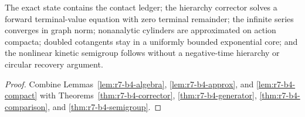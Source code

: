 \begin{theorem}
\label{thm:r7-b4-main}
The exact state contains the contact ledger; the hierarchy corrector solves a
forward terminal-value equation with zero terminal remainder; the infinite
series converges in graph norm; nonanalytic cylinders are approximated on
action compacta; doubled cotangents stay in a uniformly bounded exponential
core; and the nonlinear kinetic semigroup follows without a negative-time
hierarchy or circular recovery argument.
\end{theorem}

\begin{proof}
Combine Lemmas~\ref{lem:r7-b4-algebra},
\ref{lem:r7-b4-approx}, and
\ref{lem:r7-b4-compact} with
Theorems~\ref{thm:r7-b4-corrector},
\ref{thm:r7-b4-generator},
\ref{thm:r7-b4-comparison}, and
\ref{thm:r7-b4-semigroup}.
\end{proof}
